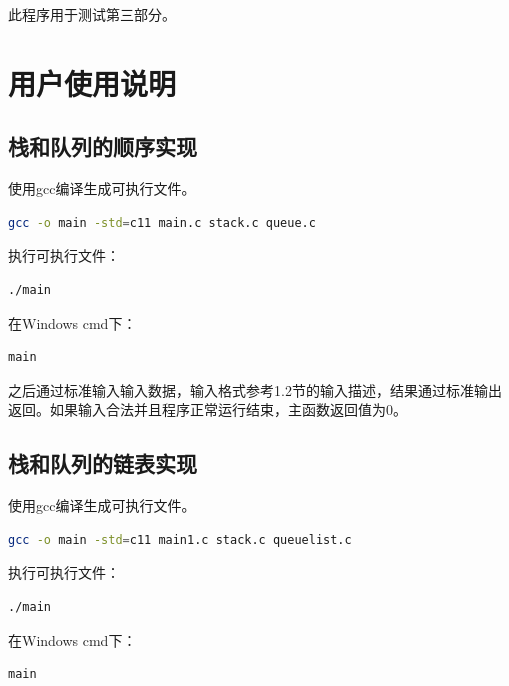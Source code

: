 \documentclass{article}
\begin{document}
此程序用于测试第三部分。

\section{用户使用说明}

\subsection{栈和队列的顺序实现}

使用gcc编译生成可执行文件。

\begin{lstlisting}[language={bash},
    basicstyle=\small\consolas]
gcc -o main -std=c11 main.c stack.c queue.c
\end{lstlisting}

执行可执行文件：

\begin{lstlisting}[language={bash},
    basicstyle=\small\consolas]
./main
\end{lstlisting}

在Windows cmd下：

\begin{lstlisting}[language={bash},
    basicstyle=\small\consolas]
main
\end{lstlisting}

之后通过标准输入输入数据，输入格式参考1.2节的输入描述，结果通过标准输出返回。如果输入合法并且程序正常运行结束，主函数返回值为0。

\subsection{栈和队列的链表实现}

使用gcc编译生成可执行文件。

\begin{lstlisting}[language={bash},
    basicstyle=\small\consolas]
gcc -o main -std=c11 main1.c stack.c queuelist.c
\end{lstlisting}

执行可执行文件：

\begin{lstlisting}[language={bash},
    basicstyle=\small\consolas]
./main
\end{lstlisting}

在Windows cmd下：

\begin{lstlisting}[language={bash},
    basicstyle=\small\consolas]
main
\end{lstlisting}
\end{document}
